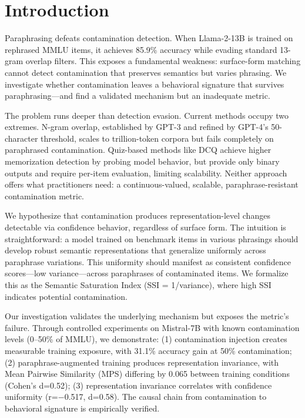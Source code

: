\section{Introduction}

Paraphrasing defeats contamination detection. When Llama-2-13B is trained on rephrased MMLU items, it achieves 85.9\% accuracy while evading standard 13-gram overlap filters. This exposes a fundamental weakness: surface-form matching cannot detect contamination that preserves semantics but varies phrasing. We investigate whether contamination leaves a behavioral signature that survives paraphrasing---and find a validated mechanism but an inadequate metric.

The problem runs deeper than detection evasion. Current methods occupy two extremes. N-gram overlap, established by GPT-3 and refined by GPT-4's 50-character threshold, scales to trillion-token corpora but fails completely on paraphrased contamination. Quiz-based methods like DCQ achieve higher memorization detection by probing model behavior, but provide only binary outputs and require per-item evaluation, limiting scalability. Neither approach offers what practitioners need: a continuous-valued, scalable, paraphrase-resistant contamination metric.

We hypothesize that contamination produces representation-level changes detectable via confidence behavior, regardless of surface form. The intuition is straightforward: a model trained on benchmark items in various phrasings should develop robust semantic representations that generalize uniformly across paraphrase variations. This uniformity should manifest as consistent confidence scores---low variance---across paraphrases of contaminated items. We formalize this as the Semantic Saturation Index (SSI = 1/variance), where high SSI indicates potential contamination.

Our investigation validates the underlying mechanism but exposes the metric's failure. Through controlled experiments on Mistral-7B with known contamination levels (0--50\% of MMLU), we demonstrate: (1) contamination injection creates measurable training exposure, with 31.1\% accuracy gain at 50\% contamination; (2) paraphrase-augmented training produces representation invariance, with Mean Pairwise Similarity (MPS) differing by 0.065 between training conditions (Cohen's d=0.52); (3) representation invariance correlates with confidence uniformity (r=$-$0.517, d=0.58). The causal chain from contamination to behavioral signature is empirically verified.

